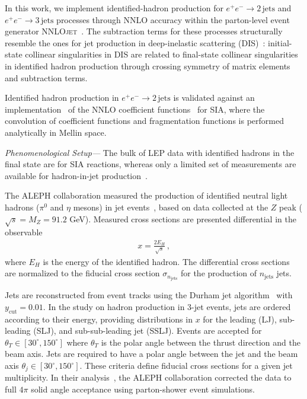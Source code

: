 \documentclass[10pt,aps,prl,twocolumn,preprintnumbers,nofootinbib]{revtex4-2}
\newcommand{\NNLOJET}{\textsc{NNLOjet}\xspace}
\newcommand{\ycut}{y_\mathrm{cut}}
\newcommand{\njets}{n_\mathrm{jets}}
\begin{document}
In this work, we implement identified-hadron production for $e^+e^- \to 2\,\mathrm{jets}$ and $e^+e^- \to 3\,\mathrm{jets}$ processes through NNLO accuracy within the parton-level event generator \NNLOJET~\cite{NNLOJET:2025rno}.
The subtraction terms for these processes structurally resemble the ones for jet production in deep-inelastic scattering (DIS)~\cite{Currie:2017tpe}: initial-state collinear singularities in DIS are related to final-state collinear singularities in identified hadron production through crossing symmetry of matrix elements and subtraction terms.

Identified hadron production in $e^+e^- \to 2\,\mathrm{jets}$ is validated against an implementation~\cite{Bonino:2023icn} of the NNLO coefficient functions~\cite{Rijken:1996vr,Rijken:1996ns,Mitov:2006ic} for SIA, where the convolution of coefficient functions and fragmentation functions is performed analytically in Mellin space.
\newline

\textit{Phenomenological Setup---}\ignorespaces
The bulk of LEP data with identified hadrons in the final state are for SIA reactions, whereas only a limited set of measurements are available for hadron-in-jet production~\cite{ALEPH:1999udi,L3:1995rnv,OPAL:2004prv}.

The ALEPH collaboration measured the production of identified neutral light hadrons ($\pi^0$ and $\eta$ mesons) in jet events~\cite{ALEPH:1999udi}, based on data collected at the $Z$ peak ($\sqrt{s}= M_Z = 91.2$ GeV).
Measured cross sections are presented differential in the observable
\begin{align}\label{eq:x}
x = \frac{2 E_H}{\sqrt{s}} \, ,
\end{align}
where $E_H$ is the energy of the identified hadron.
The differential cross sections are normalized to the fiducial cross section $\sigma_{\njets}$ for the production of $\njets$ jets.

Jets are reconstructed from event tracks using the Durham jet algorithm~\cite{Catani:1991hj} with $\ycut = 0.01$.
In the study on hadron production in 3-jet events, jets are ordered according to their energy, providing distributions in $x$ for the leading (LJ), sub-leading (SLJ), and sub-sub-leading jet (SSLJ).
Events are accepted for $\theta_T\in \left[30^\circ,150^\circ\right]$ where $\theta_T$ is the polar angle between the thrust direction and the beam axis.
Jets are required to have a polar angle between the jet and the beam axis $\theta_j \in \left[30^\circ,150^\circ\right]$.
These criteria define fiducial cross sections for a given jet multiplicity.
In their analysis~\cite{ALEPH:1999udi}, the ALEPH collaboration corrected the data to full $4\pi$ solid angle acceptance using parton-shower event simulations.
\end{document}
